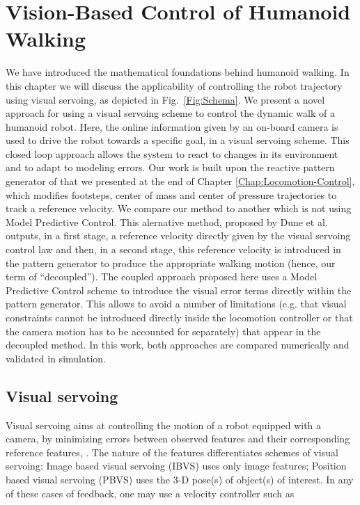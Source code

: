 \chapter{Vision-Based Control of Humanoid Walking} 
\label{Chap:Visual-Servoing}

We have introduced the mathematical foundations behind humanoid walking. In this chapter we will discuss the applicability of controlling the robot trajectory using visual servoing, as depicted in Fig.~\ref{Fig:Schema}. We present a novel approach for using a visual servoing scheme to control the dynamic walk of a humanoid robot. Here, the online information given by an on-board camera is used to drive the robot towards a specific goal, in a visual servoing scheme. This closed loop approach allows the system to react to changes in its environment and to adapt to modeling errors. Our work is built upon the reactive pattern generator of \citep{HerdtAR2010} that we presented at the end of Chapter \ref{Chap:Locomotion-Control}, which modifies footsteps, center of mass and center of pressure trajectories to track a reference velocity. We compare our method to another which is not using Model Predictive Control. This alernative method, proposed by Dune et al. \citep{DuneIROS2010} outputs, in a first stage, a reference velocity directly given by the visual servoing control law and then, in a second stage, this reference velocity is introduced in the pattern generator to produce the appropriate walking motion (hence, our term of ``decoupled''). The coupled approach proposed here uses a Model Predictive Control scheme to introduce the visual error terms directly within the pattern generator. This allows to avoid a number of limitations (e.g. that visual constraints cannot be introduced directly inside the locomotion controller or that the camera motion has to be accounted for separately) that appear in the decoupled method.  In this work, both approaches are compared numerically and validated in simulation.

\section{ Visual servoing}

Visual servoing aims at controlling the motion of a robot equipped with a camera, by minimizing errors between observed features and their corresponding reference features, \citep{ChaumetteRAM2006, ChaumetteRAM2007}. The nature of the features differentiates schemes of visual servoing: Image based visual servoing (IBVS) uses only image features; Position based visual servoing (PBVS) uses the 3-D pose(s) of object(s) of interest. In any of these cases of feedback, one may use a velocity controller such as

